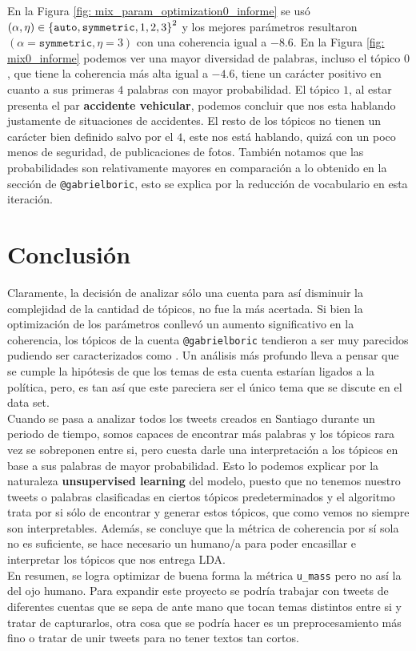 \documentclass{article}
\begin{document}
	En la Figura \ref{fig: mix_param_optimization0_informe} se usó $(\alpha,\eta)\in\left\{\texttt{auto}, \texttt{symmetric}, 1, 2, 3\right\}^2$ y los mejores parámetros resultaron $(\alpha=\texttt{symmetric},\eta=3)$ con una coherencia igual a $-8.6$. En la Figura \ref{fig: mix0_informe} podemos ver una mayor diversidad de palabras, incluso el tópico $0$, que tiene la coherencia más alta igual a $-4.6$, tiene un carácter positivo en cuanto a sus primeras $4$ palabras con mayor probabilidad. El tópico $1$, al estar presenta el par \textbf{accidente vehicular}, podemos concluir que nos esta hablando justamente de situaciones de accidentes. El resto de los tópicos no tienen un carácter bien definido salvo por el $4$, este nos está hablando, quizá con un poco menos de seguridad, de publicaciones de fotos. También notamos que las probabilidades son relativamente mayores en comparación a lo obtenido en la sección de \texttt{@gabrielboric}, esto se explica por la reducción de vocabulario en esta iteración.
	
	
\section{Conclusión}
	
	Claramente, la decisión de analizar sólo una cuenta para así disminuir la complejidad de la cantidad de tópicos, no fue la más acertada. Si bien la optimización de los parámetros conllevó un aumento significativo en la coherencia, los tópicos de la cuenta \texttt{@gabrielboric} tendieron a ser muy parecidos pudiendo ser caracterizados como . Un análisis más profundo lleva a pensar que se cumple la hipótesis de que los temas de esta cuenta estarían ligados a la política, pero, es tan así que este pareciera ser el único tema que se discute en el data set.\\
	
	Cuando se pasa a analizar todos los tweets creados en Santiago durante un periodo de tiempo, somos capaces de encontrar más palabras y los tópicos rara vez se sobreponen entre si, pero cuesta darle una interpretación a los tópicos en base a sus palabras de mayor probabilidad. Esto lo podemos explicar por la naturaleza \textbf{unsupervised learning} del modelo, puesto que no tenemos nuestro tweets o palabras clasificadas en ciertos tópicos predeterminados y el algoritmo trata por si sólo de encontrar y generar estos tópicos, que como vemos no siempre son interpretables. Además, se concluye que la métrica de coherencia por sí sola no es suficiente, se hace necesario un humano/a para poder encasillar e interpretar los tópicos que nos entrega LDA.\\
	
	En resumen, se logra optimizar de buena forma la métrica \texttt{u\_mass} pero no así la del ojo humano. Para expandir este proyecto se podría trabajar con tweets de diferentes cuentas que se sepa de ante mano que tocan temas distintos entre si y tratar de capturarlos, otra cosa que se podría hacer es un preprocesamiento más fino o tratar de unir tweets para no tener textos tan cortos.
	   

\end{document}
